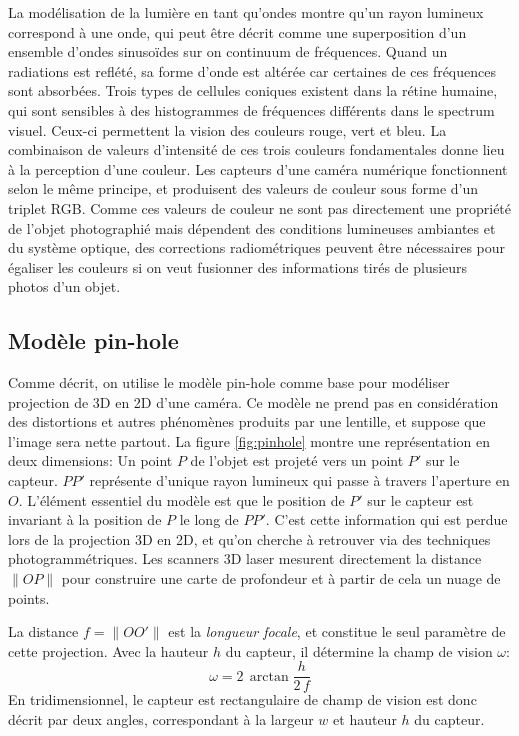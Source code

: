\documentclass[a4paper,10pt]{scrreprt}
\begin{document}
La modélisation de la lumière en tant qu'ondes montre qu'un rayon lumineux correspond à une onde, qui peut être décrit comme une superposition d'un ensemble d'ondes sinusoïdes sur on continuum de fréquences. Quand un radiations est reflété, sa forme d'onde est altérée car certaines de ces fréquences sont absorbées. Trois types de cellules coniques existent dans la rétine humaine, qui sont sensibles à des histogrammes de fréquences différents dans le spectrum visuel. Ceux-ci permettent la vision des couleurs rouge, vert et bleu. La combinaison de valeurs d'intensité de ces trois couleurs fondamentales donne lieu à la perception d'une couleur. Les capteurs d'une caméra numérique fonctionnent selon le même principe, et produisent des valeurs de couleur sous forme d'un triplet RGB. Comme ces valeurs de couleur ne sont pas directement une propriété de l'objet photographié mais dépendent des conditions lumineuses ambiantes et du système optique, des corrections radiométriques peuvent être nécessaires pour égaliser les couleurs si on veut fusionner des informations tirés de plusieurs photos d'un objet.


\subsection{Modèle pin-hole} \label{sec:pinhole}
Comme décrit, on utilise le modèle pin-hole comme base pour modéliser projection de 3D en 2D d'une caméra. Ce modèle ne prend pas en considération des distortions et autres phénomènes produits par une lentille, et suppose que l'image sera nette partout. La figure \ref{fig:pinhole} montre une représentation en deux dimensions: Un point $P$ de l'objet est projeté vers un point $P'$ sur le capteur. $P P'$ représente d'unique rayon lumineux qui passe à travers l'aperture en $O$. L'élément essentiel du modèle est que le position de $P'$ sur le capteur est invariant à la position de $P$ le long de $P P'$. C'est cette information qui est perdue lors de la projection 3D en 2D, et qu'on cherche à retrouver via des techniques photogrammétriques. Les scanners 3D laser mesurent directement la distance $\|O P\|$ pour construire une carte de profondeur et à partir de cela un nuage de points.

La distance $f = \|O O'\|$ est la \emph{longueur focale}, et constitue le seul paramètre de cette projection. Avec la hauteur $h$ du capteur, il détermine la champ de vision $\omega$:
\begin{equation}
	\omega = 2 \, \arctan \frac{h}{2 \, f}
\end{equation}
En tridimensionnel, le capteur est rectangulaire de champ de vision est donc décrit par deux angles, correspondant à la largeur $w$ et hauteur $h$ du capteur.
\end{document}
